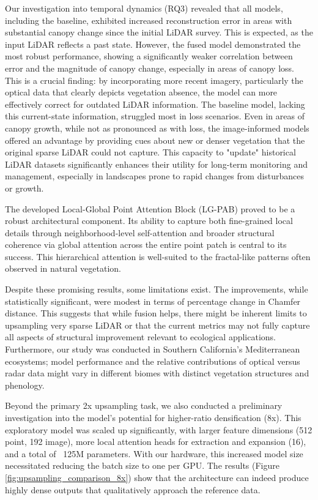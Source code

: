 \documentclass[preprints,article,accept,pdftex,moreauthors]{Definitions/mdpi}
\begin{document}
Our investigation into temporal dynamics (RQ3) revealed that all models, including the baseline, exhibited increased reconstruction error in areas with substantial canopy change since the initial LiDAR survey. This is expected, as the input LiDAR reflects a past state. However, the fused model demonstrated the most robust performance, showing a significantly weaker correlation between error and the magnitude of canopy change, especially in areas of canopy loss. This is a crucial finding: by incorporating more recent imagery, particularly the optical data that clearly depicts vegetation absence, the model can more effectively correct for outdated LiDAR information. The baseline model, lacking this current-state information, struggled most in loss scenarios. Even in areas of canopy growth, while not as pronounced as with loss, the image-informed models offered an advantage by providing cues about new or denser vegetation that the original sparse LiDAR could not capture. This capacity to "update" historical LiDAR datasets significantly enhances their utility for long-term monitoring and management, especially in landscapes prone to rapid changes from disturbances or growth.

The developed Local-Global Point Attention Block (LG-PAB) proved to be a robust architectural component. Its ability to capture both fine-grained local details through neighborhood-level self-attention and broader structural coherence via global attention across the entire point patch is central to its success. This hierarchical attention is well-suited to the fractal-like patterns often observed in natural vegetation.

Despite these promising results, some limitations exist. The improvements, while statistically significant, were modest in terms of percentage change in Chamfer distance. This suggests that while fusion helps, there might be inherent limits to upsampling very sparse LiDAR or that the current metrics may not fully capture all aspects of structural improvement relevant to ecological applications. Furthermore, our study was conducted in Southern California's Mediterranean ecosystems; model performance and the relative contributions of optical versus radar data might vary in different biomes with distinct vegetation structures and phenology.

Beyond the primary 2x upsampling task, we also conducted a preliminary investigation into the model's potential for higher-ratio densification (8x). This exploratory model was scaled up significantly, with larger feature dimensions (512 point, 192 image), more local attention heads for extraction and expansion (16), and a total of ~125M parameters. With our hardware, this increased model size necessitated reducing the batch size to one per GPU. The results (Figure \ref{fig:upsampling_comparison_8x}) show that the architecture can indeed produce highly dense outputs that qualitatively approach the reference data.
\end{document}
